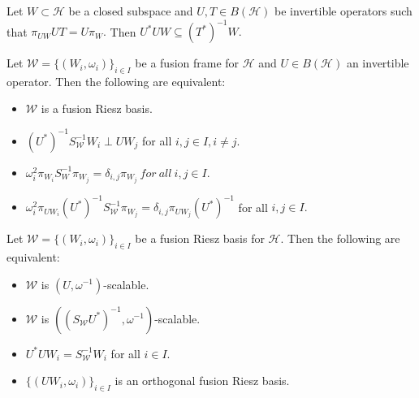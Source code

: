 \documentclass[10pt,a4paper]{amsart}
\begin{document}
\begin{lemma}\label{extend Gav}
Let $ W\subset \mathcal{H}$ be a closed subspace and $U,T \in B(\mathcal{H})$ be invertible operators such that $\pi_{UW}UT=U\pi_{W}.$ Then $U^{*}UW\subseteq \left( T^{*}\right) ^{-1}W.$
\end{lemma}

\begin{lemma}\label{r.e}
Let $\mathcal{W}=\{(W_{i},\omega_{i})\}_{i \in I} $ be a fusion frame for $\mathcal {H}$ and $U \in B(\mathcal{H})$ an invertible operator. Then the following are equivalent:
\begin{itemize}
\item[$(i)$] $\mathcal{W}$ is a fusion Riesz basis.
\item[$(ii)$] $ \left( U^*\right) ^{-1}S_{\mathcal{W}}^{-1}W_{i}\perp UW_{j}$ for all $i,j \in I, i\neq j. $
\item[$(iii)$] $ \omega_{i}^{2}\pi_{W_{i}}S_{W}^{-1}\pi_{W_{j}}=\delta_{i,j}\pi_{W_{j}}~ for~all~ i , j \in I $.
\item[$(iv)$] $\omega_{i}^{2}\pi_{UW_{i}}\left( U^*\right) ^{-1}S_{\mathcal{W}}^{-1}\pi_{W_{j}}=\delta_{i,j}\pi_{UW_{j}}\left( U^*\right) ^{-1}$ for all $i,j \in I.$
\end{itemize}
\end{lemma}

\begin{theorem}\label{in case Riesz}
Let $\mathcal{W}=\{(W_{i},\omega_{i})\}_{i \in I} $ be a fusion Riesz basis for $\mathcal {H}$. Then the following are equivalent:
\begin{itemize}
\item[$(i)$] $\mathcal{W}$ is $\left( U,\omega^{-1}\right) $-scalable.
\item[$(ii)$] $\mathcal{W}$ is $\left( \left( S_{\mathcal{W}}U^*\right) ^{-1},\omega^{-1}\right) $-scalable.
\item[$(iii)$] $U^*UW_{i}=S_{\mathcal{W}}^{-1}W_{i}$ for all $ i \in I.$   
\item[$(iv)$] $\{(UW_{i},\omega_{i})\}_{i \in I} $ is an orthogonal fusion Riesz basis.
\end{itemize}
\end{theorem}
\end{document}
